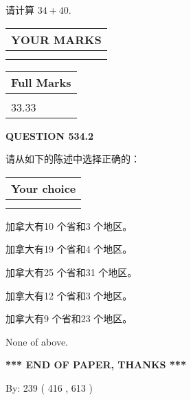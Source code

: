 \documentclass{ctexart}
\begin{document}
  
 
请计算 $ %
34 +  %
40 $.
 

 

 
  
\vspace{0.2in}
  
\noindent\begin{tabular}{|l|}
\hline
 YOUR MARKS  \\
\hline
 \\ 
 \\ 
\hline
\end{tabular}
\hspace{0.05in} \begin{tabular}{|l|}
\hline
 Full Marks  \\
\hline
 \\ 
33.33 \\
\hline
\end{tabular}
{\textbf{\Large{QUESTION
534.2 
}}}
  
  
请从如下的陈述中选择正确的：
  
  
\noindent\hspace{3.0in} \begin{tabular}{|l|}
\hline
Your choice \\
\hline
 \\ 
 \\ 
\hline
\end{tabular}
  
  
 
 
加拿大有10 个省和3 个地区。
 
 
加拿大有19 个省和4 个地区。
 
 
加拿大有25 个省和31 个地区。
 
 
加拿大有12 个省和3 个地区。
 
 
加拿大有9 个省和23 个地区。
 
 
 None of above.
 
 
   
   
 \vspace{0.2in}
 
   
   
   
   
\vspace{1.0in} 
{\textbf{\large{ *** END OF PAPER, THANKS *** }}} 
   
   
\hspace{1.0in} By: 
 239 ( 416 ,  613 )
   
\end{document}
